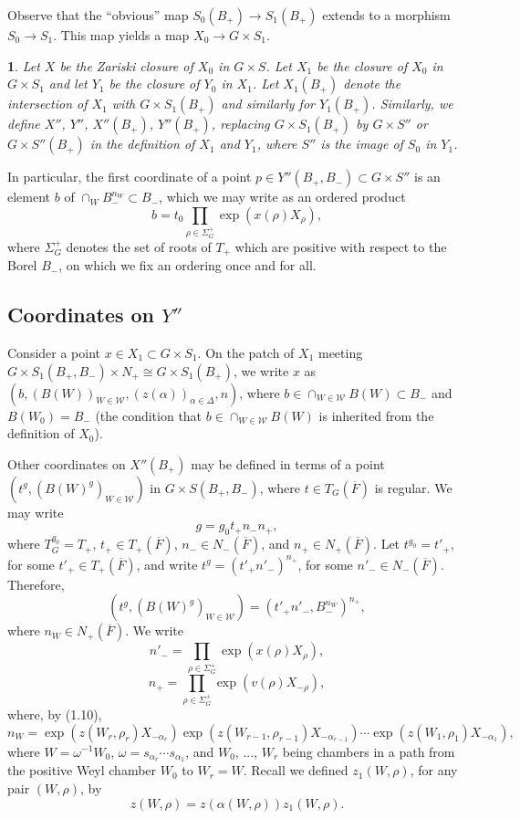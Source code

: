 \documentclass[12pt,letterpaper]{amsart}
\newcommand{\ovF}{\overline{F}}
\newcommand{\proclaimname}{}
\newtheorem*{proclaimx}{\proclaimname}
\newenvironment{proclaim}[1]%
  {\renewcommand{\proclaimname}{#1}\begin{proclaimx}}{\end{proclaimx}}
\begin{document}
Observe that the ``obvious'' map $S_0(B_+)\rightarrow S_1(B_+)$
extends to a morphism $S_0\rightarrow S_1$. This map yields a map
$X_0\rightarrow G\times S_1$.

\begin{proclaim}{Definition 1.16}
Let $X$ be the Zariski closure of $X_0$ in $G\times S$.
Let $X_1$ be the closure of $X_0$ in $G\times S_1$ and let $Y_1$
be the closure of $Y_0$ in $X_1$. Let $X_1(B_+)$ denote the
intersection of $X_1$ with $G\times S_1(B_+)$ and similarly for
$Y_1(B_+)$. Similarly, we define $X''$, $Y''$, $X''(B_+)$,
$Y''(B_+)$, replacing $G\times S_1(B_+)$
by $G\times S''$ or $G\times S''(B_+)$ in the definition of
$X_1$ and $Y_1$, where $S''$ is the image of $S_0$ in $Y_1$.
\end{proclaim}

In particular, the first coordinate of a point
$p\in Y''(B_+,B_-)\subset G\times S''$ is an element
$b$ of $\cap_W B_-^{n_W} \subset B_-$, which we may write as
an ordered product
\[
b=t_0\prod_{\rho\in\Sigma_G^+}\exp (x(\rho)X_\rho),
\tag{1.17}
\]
where $\Sigma_G^+$ denotes the set of roots of $T_+$
which are positive with respect to the Borel $B_-$, on which
we fix an ordering once and for all.

\subsection*{Coordinates on $Y''$}

Consider a point $x\in X_1\subset G\times S_1$.
On the patch of $X_1$ meeting
$G\times S_1(B_+,B_-)\times N_+\cong
G\times S_1(B_+)$, we write $x$ as
$(b,\allowbreak(B(W))_{W\in{\mathcal W}},\allowbreak(z(\alpha))_{\alpha\in\Delta},\allowbreak n)$,
where $b\in\cap_{W\in{\mathcal W}}B(W)\subset B_-$ and
$B(W_0)=B_-$ (the condition that $b\in\cap_{W\in{\mathcal W}}B(W)$
is inherited from the definition of $X_0$).

Other coordinates on $X''(B_+)$ may be defined in terms of a point
$(t^g,(B(W)^g)_{W\in{\mathcal W}})$ in
$G\times S(B_+,B_-)$, where $t\in T_G(\ovF )$ is regular. We may write
\[
g=g_0t_+n_-n_+,
\]
where $T_G^{g_0}=T_+$, $t_+\in T_+(\ovF)$, $n_-\in N_-(\ovF)$,
and $n_+\in N_+(\ovF)$. Let $t^{g_0}=t'_+$, for some
$t'_+\in T_+(\ovF)$, and write $t^g=(t'_+n'_-)^{n_+}$,
for some $n'_-\in N_-(\ovF)$. Therefore,
\[
(t^g,(B(W)^g)_{W\in{\mathcal W}})=(t'_+n'_-,B_-^{n_W})^{n_+},
\]
where $n_W\in N_+(\ovF)$. We write
\[
n'_-=\prod_{\rho\in\Sigma_G^+}\exp (x(\rho)X_\rho),
\]
\[
n_+=\prod_{\rho\in\Sigma_G^+}\exp (v(\rho)X_{-\rho}),
\]
where, by (1.10),
\[
n_W=\exp (z(W_r,\rho_r)X_{-\alpha_r})
\exp (z(W_{r-1},\rho_{r-1})X_{-\alpha_{r-1}})\cdots
\exp (z(W_1,\rho_1)X_{-\alpha_1}),
\tag{1.18}
\]
where $W=\omega^{-1}W_0$, $\omega=s_{\alpha_r}\cdots s_{\alpha_1}$,
and $W_0$, ..., $W_r$ being chambers in a path from the positive Weyl chamber
$W_0$
to $W_r=W$. Recall we defined $z_1(W,\rho)$, for any pair $(W,\rho)$, by
\[
z(W,\rho)=z(\alpha(W,\rho))z_1(W,\rho).
\tag{1.19}
\]
\end{document}
